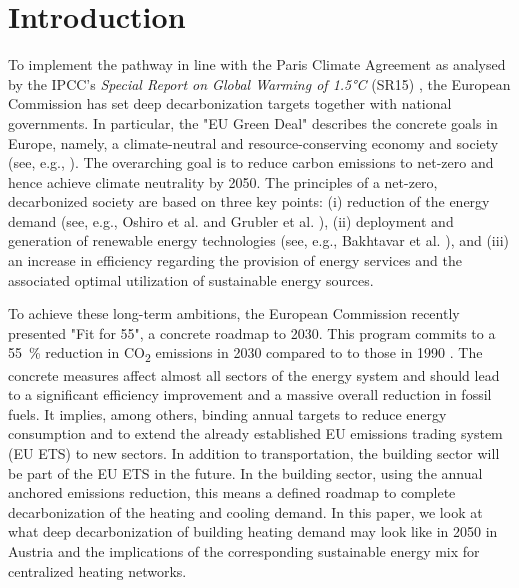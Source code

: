 \section{Introduction}
To implement the pathway in line with the Paris Climate Agreement \cite{agreement2015paris} as analysed by the IPCC's \emph{Special Report on Global Warming of 1.5°C} (SR15) \cite{book}, the European Commission has set deep decarbonization targets together with national governments. In particular, the "EU Green Deal" describes the concrete goals in Europe, namely, a climate-neutral and resource-conserving economy and society (see, e.g., \cite{kemfert2019green}). The overarching goal is to reduce carbon emissions to net-zero and hence achieve climate neutrality by 2050. The principles of a net-zero, decarbonized society are based on three key points: (i) reduction of the energy demand (see, e.g., Oshiro et al. \cite{oshiro2021enabling} and Grubler et al. \cite{grubler2018low}), (ii) deployment and generation of renewable energy technologies (see, e.g., Bakhtavar et al. \cite{bakhtavar2020assessment}), and (iii) an increase in efficiency regarding the provision of energy services and the associated optimal utilization of sustainable energy sources.\vspace{0.3cm}

To achieve these long-term ambitions, the European Commission recently presented "Fit for 55", a concrete roadmap to 2030. This program commits to a \SI{55}{\%} reduction in CO\textsubscript{2} emissions in 2030 compared to to those in 1990 \cite{european_commission_european_2019}. The concrete measures affect almost all sectors of the energy system and should lead to a significant efficiency improvement and a massive overall reduction in fossil fuels. It implies, among others, binding annual targets to reduce energy consumption and to extend the already established EU emissions trading system (EU ETS) to new sectors. In addition to transportation, the building sector will be part of the EU ETS in the future. In the building sector, using the annual anchored emissions reduction, this means a defined roadmap to complete decarbonization of the heating and cooling demand. In this paper, we look at what deep decarbonization of building heating demand may look like in 2050 in Austria and the implications of the corresponding sustainable energy mix for centralized heating networks.

